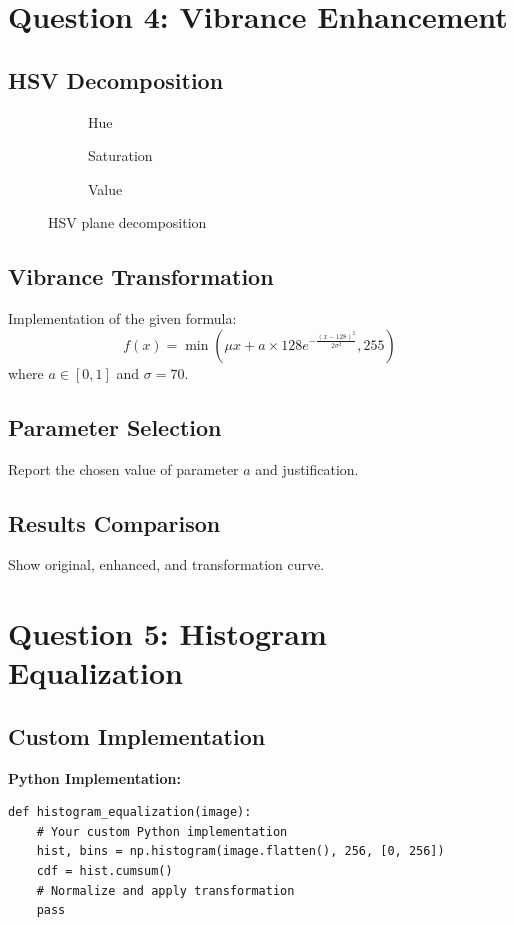 \documentclass[11pt]{article}
\begin{document}
\section{Question 4: Vibrance Enhancement}
\subsection{HSV Decomposition}
\begin{figure}[H]
    \centering
    \begin{subfigure}{0.3\textwidth}
        \fbox{\rule{0pt}{1.5in}\rule{1.5in}{0pt}}
        \caption{Hue}
    \end{subfigure}
    \hfill
    \begin{subfigure}{0.3\textwidth}
        \fbox{\rule{0pt}{1.5in}\rule{1.5in}{0pt}}
        \caption{Saturation}
    \end{subfigure}
    \hfill
    \begin{subfigure}{0.3\textwidth}
        \fbox{\rule{0pt}{1.5in}\rule{1.5in}{0pt}}
        \caption{Value}
    \end{subfigure}
    \caption{HSV plane decomposition}
\end{figure}

\subsection{Vibrance Transformation}
Implementation of the given formula:
\[
f(x) = \min\left(\mu x + a \times 128 e^{-\frac{(x-128)^2}{2\sigma^2}}, 255\right)
\]
where $a \in [0,1]$ and $\sigma = 70$.

\subsection{Parameter Selection}
Report the chosen value of parameter $a$ and justification.

\subsection{Results Comparison}
Show original, enhanced, and transformation curve.

\section{Question 5: Histogram Equalization}
\subsection{Custom Implementation}
\textbf{Python Implementation:}
\begin{lstlisting}[style=pythonstyle]
def histogram_equalization(image):
    # Your custom Python implementation
    hist, bins = np.histogram(image.flatten(), 256, [0, 256])
    cdf = hist.cumsum()
    # Normalize and apply transformation
    pass
\end{lstlisting}
\end{document}
